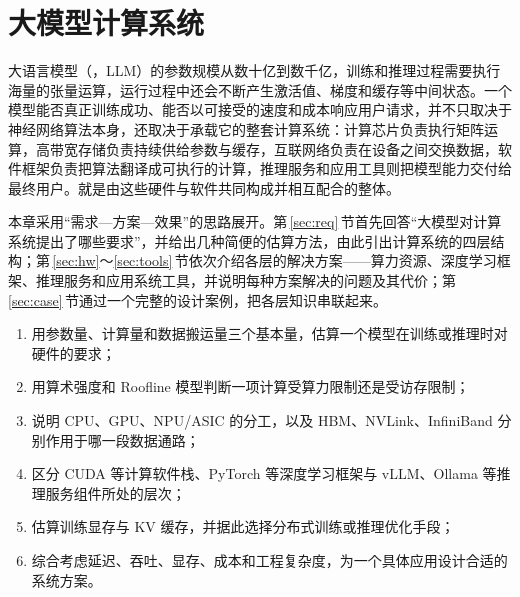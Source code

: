 \chapter{大模型计算系统}
\label{ch:system}

大语言模型（，LLM）的参数规模从数十亿到数千亿，训练和推理过程需要执行海量的张量运算，运行过程中还会不断产生激活值、梯度和缓存等中间状态。一个模型能否真正训练成功、能否以可接受的速度和成本响应用户请求，并不只取决于神经网络算法本身，还取决于承载它的整套计算系统：计算芯片负责执行矩阵运算，高带宽存储负责持续供给参数与缓存，互联网络负责在设备之间交换数据，软件框架负责把算法翻译成可执行的计算，推理服务和应用工具则把模型能力交付给最终用户。就是由这些硬件与软件共同构成并相互配合的整体。

本章采用“需求—方案—效果”的思路展开。第\,\ref{sec:req}\,节首先回答“大模型对计算系统提出了哪些要求”，并给出几种简便的估算方法，由此引出计算系统的四层结构；第\,\ref{sec:hw}～\ref{sec:tools}\,节依次介绍各层的解决方案——算力资源、深度学习框架、推理服务和应用系统工具，并说明每种方案解决的问题及其代价；第\,\ref{sec:case}\,节通过一个完整的设计案例，把各层知识串联起来。

\begin{guide}
\begin{enumerate}[leftmargin=2em]
  \item 用参数量、计算量和数据搬运量三个基本量，估算一个模型在训练或推理时对硬件的要求；
  \item 用算术强度和 Roofline 模型判断一项计算受算力限制还是受访存限制；
  \item 说明 CPU、GPU、NPU/ASIC 的分工，以及 HBM、NVLink、InfiniBand 分别作用于哪一段数据通路；
  \item 区分 CUDA 等计算软件栈、PyTorch 等深度学习框架与 vLLM、Ollama 等推理服务组件所处的层次；
  \item 估算训练显存与 KV 缓存，并据此选择分布式训练或推理优化手段；
  \item 综合考虑延迟、吞吐、显存、成本和工程复杂度，为一个具体应用设计合适的系统方案。
\end{enumerate}
\end{guide}
